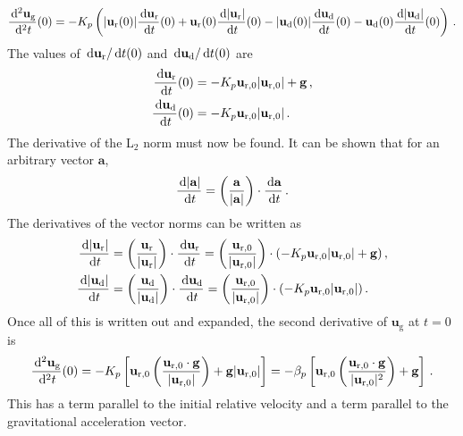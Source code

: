 \begin{align}
    \frac{\,\mathrm{d}^2 \mathbf{u}_\text{g}}{\,\mathrm{d}^2 t}(0) = -K_p \left(|\mathbf{u}_\text{r}(0)| \frac{\,\mathrm{d} \mathbf{u}_\text{r}}{\,\mathrm{d} t}(0) + \mathbf{u}_\text{r}(0) \frac{\,\mathrm{d} |\mathbf{u}_\text{r}|}{\,\mathrm{d} t}(0) - |\mathbf{u}_\text{d}(0)| \frac{\,\mathrm{d} \mathbf{u}_\text{d}}{\,\mathrm{d} t}(0) - \mathbf{u}_\text{d}(0) \frac{\,\mathrm{d} |\mathbf{u}_\text{d}|}{\,\mathrm{d} t}(0)\right) \,.
\end{align}
The values of $\,\mathrm{d} \mathbf{u}_\text{r} / \,\mathrm{d} t(0)$ and $\,\mathrm{d} \mathbf{u}_\text{d} / \,\mathrm{d} t(0)$ are
\begin{align*}
    \frac{\,\mathrm{d} \mathbf{u}_\text{r}}{\,\mathrm{d} t}(0) &= -K_p \mathbf{u}_{\text{r},0} |\mathbf{u}_{\text{r},0}| + \mathbf{g} \,, \\
    \frac{\,\mathrm{d} \mathbf{u}_\text{d}}{\,\mathrm{d} t}(0) &= -K_p \mathbf{u}_{\text{r},0} |\mathbf{u}_{\text{r},0}| \,.
\end{align*}
The derivative of the L$_2$ norm must now be found. It can be shown that for an arbitrary vector $\mathbf{a}$,
\begin{align*}
    \frac{\,\mathrm{d} |\mathbf{a}|}{\,\mathrm{d} t} = \left(\frac{\mathbf{a}}{|\mathbf{a}|}\right) \cdot \frac{\,\mathrm{d} \mathbf{a}}{\,\mathrm{d} t} \,.
\end{align*}
The derivatives of the vector norms can be written as
\begin{align}
    \frac{\,\mathrm{d} |\mathbf{u}_\text{r}|}{\,\mathrm{d} t} &= \left(\frac{\mathbf{u}_\text{r}}{|\mathbf{u}_\text{r}|}\right) \cdot \frac{\,\mathrm{d} \mathbf{u}_\text{r}}{\,\mathrm{d} t} = \left(\frac{\mathbf{u}_{\text{r},0}}{|\mathbf{u}_{\text{r},0}|}\right) \cdot (-K_p \mathbf{u}_{\text{r},0} |\mathbf{u}_{\text{r},0}| + \mathbf{g}) \,,  \\
    \frac{\,\mathrm{d} |\mathbf{u}_\text{d}|}{\,\mathrm{d} t} &= \left(\frac{\mathbf{u}_\text{d}}{|\mathbf{u}_\text{d}|}\right) \cdot \frac{\,\mathrm{d} \mathbf{u}_\text{d}}{\,\mathrm{d} t} = \left(\frac{\mathbf{u}_{\text{r},0}}{|\mathbf{u}_{\text{r},0}|}\right) \cdot (-K_p \mathbf{u}_{\text{r},0} |\mathbf{u}_{\text{r},0}|) \,.
\end{align}
Once all of this is written out and expanded, the second derivative of $\mathbf{u}_\text{g}$ at $t = 0$ is
\begin{align}
    \frac{\,\mathrm{d}^2 \mathbf{u}_\text{g}}{\,\mathrm{d}^2 t}(0) = -K_p \left[\mathbf{u}_{\text{r},0} \left(\frac{\mathbf{u}_{\text{r},0} \cdot \mathbf{g}}{|\mathbf{u}_{\text{r},0}|}\right) + \mathbf{g} |\mathbf{u}_{\text{r},0}|\right] = - \beta_p \left[\mathbf{u}_{\text{r},0} \left(\frac{\mathbf{u}_{\text{r},0} \cdot \mathbf{g}}{|\mathbf{u}_{\text{r},0}|^2}\right) + \mathbf{g}\right] \,.
\end{align}
This has a term parallel to the initial relative velocity and a term parallel to the gravitational acceleration vector.

